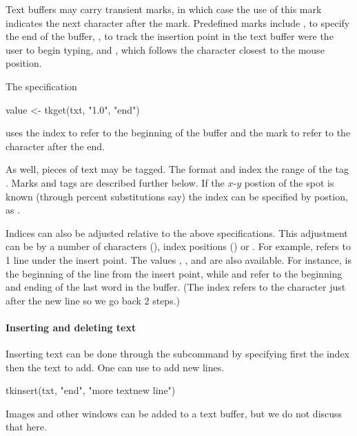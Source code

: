 Text buffers may carry transient marks, in which case the use of this
mark indicates the next character after the mark. Predefined marks
include , to specify the end of the buffer, ,
to track the insertion point in the text buffer were the user to begin
typing, and , which follows the character closest to the
mouse position.

The specification
\begin{Schunk}
\begin{Sinput}
 value <- tkget(txt, "1.0", "end")
\end{Sinput}
\end{Schunk}
uses the index  to refer to the beginning of the buffer and
the mark  to refer to the character after the end.

As well, pieces of text may be tagged. The format  and
 index the range of the tag . Marks and tags
are described further below. If the $x$-$y$ postion of the spot is known
(through percent substitutions say) the index can be specified by
postion, as .

Indices can also be adjusted relative to the above
specifications. This adjustment can be by a number of characters
(), index positions () or . For
example,  refers to 1 line under the insert
point. The values , , 
and  are also available. For instance,  is the beginning of the line from the insert point, while
 and  refer to the
beginning and ending of the last word in the buffer. (The 
index refers to the character just after the new line so we go back 2
steps.)

\paragraph{Inserting and deleting text}
Inserting text can be done through the 
subcommand by specifying first the index then the text to add. One can
use  to add new lines.
\begin{Schunk}
\begin{Sinput}
 tkinsert(txt, "end", "more text\n new line")  
\end{Sinput}
\end{Schunk}
Images and other windows can be added to a text buffer, but we do not discuss that here.

